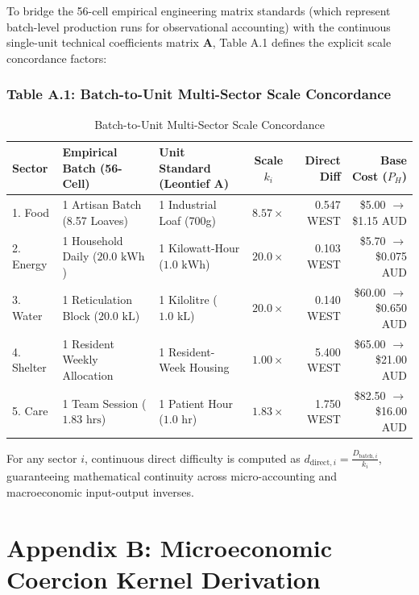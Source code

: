 \documentclass[preprint,12pt,authoryear]{elsarticle}
\theoremstyle{definition}
\begin{document}
To bridge the 56-cell empirical engineering matrix standards (which represent batch-level production runs for observational accounting) with the continuous single-unit technical coefficients matrix $\mathbf{A}$, Table A.1 defines the explicit scale concordance factors:

\subsubsection*{Table A.1: Batch-to-Unit Multi-Sector Scale Concordance}

\begin{table}[htbp]
\centering
\small
\caption{Batch-to-Unit Multi-Sector Scale Concordance}
\label{tab:scale_concordance}
\begin{tabularx}{\textwidth}{l p{4.2cm} p{4.2cm} c r r}
\toprule
\textbf{Sector} & \textbf{Empirical Batch (56-Cell)} & \textbf{Unit Standard (Leontief $\mathbf{A}$)} & \textbf{Scale $k_i$} & \textbf{Direct Diff} & \textbf{Base Cost ($P_H$)} \\
\midrule
1. Food & 1 Artisan Batch (8.57 Loaves) & 1 Industrial Loaf (700g) & $8.57\times$ & 0.547 WEST & \$5.00 $\to$ \$1.15 AUD \\
2. Energy & 1 Household Daily ($20.0\text{ kWh}$) & 1 Kilowatt-Hour ($1.0\text{ kWh}$) & $20.0\times$ & 0.103 WEST & \$5.70 $\to$ \$0.075 AUD \\
3. Water & 1 Reticulation Block ($20.0\text{ kL}$) & 1 Kilolitre ($1.0\text{ kL}$) & $20.0\times$ & 0.140 WEST & \$60.00 $\to$ \$0.650 AUD \\
4. Shelter & 1 Resident Weekly Allocation & 1 Resident-Week Housing & $1.00\times$ & 5.400 WEST & \$65.00 $\to$ \$21.00 AUD \\
5. Care & 1 Team Session ($1.83\text{ hrs}$) & 1 Patient Hour ($1.0\text{ hr}$) & $1.83\times$ & 1.750 WEST & \$82.50 $\to$ \$16.00 AUD \\
\bottomrule
\end{tabularx}
\end{table}

For any sector $i$, continuous direct difficulty is computed as $d_{\text{direct}, i} = \frac{D_{\text{batch}, i}}{k_i}$, guaranteeing mathematical continuity across micro-accounting and macroeconomic input-output inverses.



\section*{Appendix B: Microeconomic Coercion Kernel Derivation}
\end{document}
